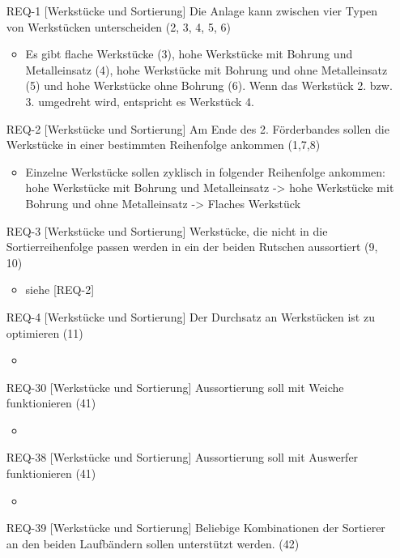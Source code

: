 \begin{itemize}
    \item[REQ-1][Werkstücke und Sortierung] Die Anlage kann zwischen vier Typen von Werkstücken unterscheiden (2, 3, 4, 5, 6)
    \begin{itemize}
        \item Es gibt flache Werkstücke (3), hohe Werkstücke mit Bohrung und Metalleinsatz (4), hohe Werkstücke mit Bohrung und ohne Metalleinsatz (5) und hohe Werkstücke ohne Bohrung (6). Wenn das Werkstück 2. bzw. 3. umgedreht wird, entspricht es Werkstück 4.
    \end{itemize}
    \item[REQ-2][Werkstücke und Sortierung] Am Ende des 2. Förderbandes sollen die Werkstücke in einer bestimmten Reihenfolge ankommen (1,7,8)
    \begin{itemize}
        \item Einzelne Werkstücke sollen zyklisch in folgender Reihenfolge ankommen: hohe Werkstücke mit Bohrung und Metalleinsatz -> hohe Werkstücke mit Bohrung und ohne Metalleinsatz -> Flaches Werkstück
    \end{itemize}
    \item[REQ-3][Werkstücke und Sortierung] Werkstücke, die nicht in die Sortierreihenfolge passen werden in ein der beiden Rutschen aussortiert (9, 10)
    \begin{itemize}
        \item siehe [REQ-2]
    \end{itemize}
    \item[REQ-4][Werkstücke und Sortierung] Der Durchsatz an Werkstücken ist zu optimieren (11)
    \begin{itemize}
        \item
    \end{itemize}
    \item[REQ-30][Werkstücke und Sortierung] Aussortierung soll mit Weiche funktionieren (41)
    \begin{itemize}
        \item
    \end{itemize}
    \item[REQ-38][Werkstücke und Sortierung] Aussortierung soll mit Auswerfer funktionieren (41)
    \begin{itemize}
        \item
    \end{itemize}
    \item[REQ-39][Werkstücke und Sortierung] Beliebige Kombinationen der Sortierer an den beiden Laufbändern sollen unterstützt werden. (42)

\end{itemize}
